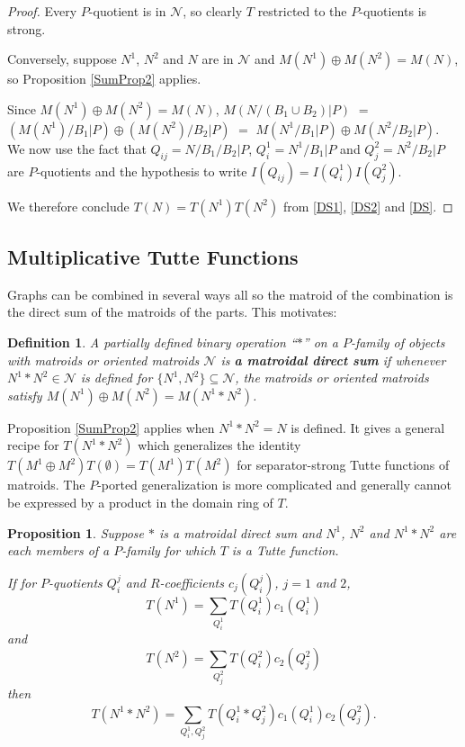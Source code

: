 \documentclass[12pt,leqno]{amsart}
\newtheorem{prop}[lem]{Proposition}
\newtheorem{definition}[lem]{Definition}
\theoremstyle{remark}
\begin{document}
\begin{proof}
Every $P$-quotient is in $\mathcal{N}$, so clearly $T$ restricted
to the $P$-quotients is strong.

Conversely, suppose $N^1$, $N^2$ and $N$ are in $\mathcal{N}$ and
$M(N^1)\oplus M(N^2)=M(N)$, so Proposition \ref{SumProp2} applies.

Since $M(N^1)\oplus M(N^2)=M(N)$, 
$M(N/(B_1\cup B_2)|P)$ $=$ $(M(N^1)/B_1|P)\oplus (M(N^2)/B_2|P)$
$=$ $M(N^1/B_1|P)\oplus M(N^2/B_2|P)$.  
We now use the fact
that $Q_{ij}=N/B_1/B_2|P$, $Q^1_i=N^1/B_1|P$ and $Q^2_j=N^2/B_2|P$ are 
$P$-quotients and the hypothesis to
write $I(Q_{ij})=I(Q^1_i)I(Q^2_j)$.  


We therefore conclude $T(N)=T(N^1)T(N^2)$
from \eqref{DS1}, \eqref{DS2} and  \eqref{DS}.

\end{proof}

\subsection{Multiplicative Tutte Functions}

Graphs can be combined in several ways all so
the matroid of the combination is the direct
sum of the matroids of the parts. This motivates:

\begin{definition}
A partially defined binary operation ``$*$'' on
a $P$-family of objects with matroids or oriented matroids
$\mathcal{N}$ is \textbf{a matroidal direct sum} if 
whenever $N^1*N^2\in\mathcal{N}$ is defined for
$\{N^1,N^2\}\subseteq\mathcal{N}$, the 
matroids or oriented matroids satisfy
$M(N^1)\oplus M(N^2) = M(N^1*N^2)$.
\end{definition}

Proposition \ref{SumProp2} applies
when $N^1*N^2=N$ is defined.
It gives a general recipe for $T(N^1*N^2)$ which generalizes
the identity \cite{Ellis-Monaghan-Traldi}
$T(M^1\oplus M^2)T(\emptyset)=T(M^1)T(M^2)$ 
for separator-strong Tutte functions of
matroids.
The $P$-ported generalization is more complicated and generally cannot
be expressed by a product in the domain ring of $T$.  

\begin{prop}
\label{SumProp}
Suppose $*$ is a matroidal direct sum and
$N^1$, $N^2$ and $N^1*N^2$ are each members of a $P$-family
for which $T$ is a Tutte function.

If for $P$-quotients $Q^j_i$ and $R$-coefficients $c_j(Q^j_i)$, $j=1$ and $2$,
\begin{equation*}
T(N^1) = \sum_{Q^1_i}T(Q^1_{i})c_1(Q^1_{i})
\end{equation*}
and
\begin{equation*}
T(N^2) = \sum_{Q^2_j}T(Q^2_{i})c_2(Q^2_{j})
\end{equation*}
then
\begin{equation*}
T(N^1 * N^2) = \sum_{Q^1_i,Q^2_j}T(Q^1_{i}*Q^2_{j})c_1(Q^1_{i})c_2(Q^2_{j}).
\end{equation*}
\end{prop}
\end{document}

